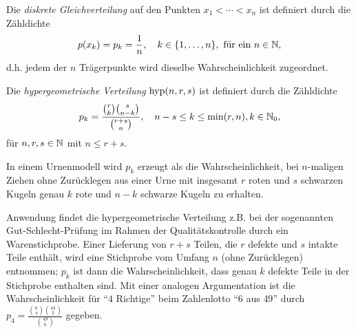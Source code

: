 \documentclass{lecture}
\begin{document}
    \begin{definition}
        Die \emph{diskrete Gleichverteilung} auf den Punkten \(x_1 < \cdots < x_n\) ist definiert durch die Zähldichte
        \[
            p\parentheses*{x_k} = p_k = \frac{1}{n}, \quad k \in \braces*{1, \ldots, n},\text{ für ein }n \in \N,
        \]
        d.h. jedem der \(n\) Trägerpunkte wird dieselbe Wahrscheinlichkeit zugeordnet.
    \end{definition}

    \begin{definition}
        Die \emph{hypergeometrische Verteilung} \(\hyp\parentheses*{n, r, s}\) ist definiert durch die Zähldichte
        \[
            p_k = \frac{\binom{r}{k}\binom{s}{n - k}}{\binom{r + s}{n}}, \quad n - s \le k \le \min\parentheses*{r, n}, k \in \N_0,
        \]
        für \(n, r, s \in \mathbb{N}\) mit \(n \le r + s\).
    \end{definition}

    In einem Urnenmodell wird \(p_k\) erzeugt als die Wahrscheinlichkeit, bei \(n\)-maligen Ziehen ohne Zurücklegen aus einer Urne mit insgesamt \(r\) roten und \(s\) schwarzen Kugeln genau \(k\) rote und \(n - k\) schwarze Kugeln zu erhalten.

    Anwendung findet die hypergeometrische Verteilung z.B. bei der sogenannten Gut-Schlecht-Prüfung im Rahmen der Qualitätskontrolle durch ein Warenstichprobe.
    Einer Lieferung von \(r + s\) Teilen, die \(r\) defekte und \(s\) intakte Teile enthält, wird eine Stichprobe vom Umfang \(n\) (ohne Zurücklegen) entnommen; \(p_k\) ist dann die Wahrscheinlichkeit, dass genau \(k\) defekte Teile in der Stichprobe enthalten sind.
    Mit einer analogen Argumentation ist die Wahrscheinlichkeit für ``\(4\) Richtige'' beim Zahlenlotto ``\(6\) aus \(49\)'' durch \(p_4 = \frac{\binom{6}{4}\binom{43}{2}}{\binom{49}{6}}\) gegeben.
\end{document}
